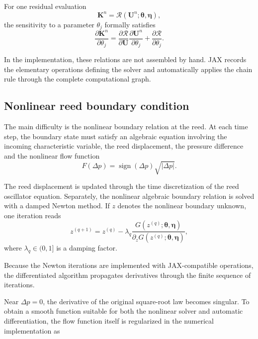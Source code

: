 \documentclass[11pt,a4paper]{report}
\theoremstyle{plain}
\theoremstyle{definition}
\begin{document}
For one residual evaluation
\begin{equation}
\mathbf{K}^n
=
\mathcal{R}
\left(
\mathbf{U}^n;
\boldsymbol{\theta},
\boldsymbol{\eta}
\right),
\end{equation}
the sensitivity to a parameter \(\theta_j\) formally satisfies
\begin{equation}
\frac{\partial \mathbf{K}^n}{\partial\theta_j}
=
\frac{\partial\mathcal{R}}{\partial\mathbf{U}}
\frac{\partial\mathbf{U}^n}{\partial\theta_j}
+
\frac{\partial\mathcal{R}}{\partial\theta_j}.
\label{eq:stage_sensitivity}
\end{equation}

In the implementation, these relations are not assembled by hand. JAX records
the elementary operations defining the solver and automatically applies the
chain rule through the complete computational graph.

\subsection{Nonlinear reed boundary condition}

The main difficulty is the nonlinear boundary relation at the reed. At each
time step, the boundary state must satisfy an algebraic equation involving the
incoming characteristic variable, the reed displacement, the pressure
difference and the nonlinear flow function
\begin{equation}
F(\Delta p)
=
\operatorname{sign}(\Delta p)
\sqrt{|\Delta p|}.
\end{equation}

The reed displacement is updated through the time discretization of the reed
oscillator equation. Separately, the nonlinear algebraic boundary relation is
solved with a damped Newton method. If \(z\) denotes the nonlinear boundary
unknown, one iteration reads
\begin{equation}
z^{(q+1)}
=
z^{(q)}
-
\lambda_q
\frac{
G(z^{(q)};\boldsymbol{\theta},\boldsymbol{\eta})
}{
\partial_z G(z^{(q)};\boldsymbol{\theta},\boldsymbol{\eta})
},
\label{eq:newton_iteration_diff}
\end{equation}
where \(\lambda_q\in(0,1]\) is a damping factor.

Because the Newton iterations are implemented with JAX-compatible operations,
the differentiated algorithm propagates derivatives through the finite sequence
of iterations.

Near $\Delta p=0$, the derivative of the original square-root law becomes
singular. To obtain a smooth function suitable for both the nonlinear solver
and automatic differentiation, the flow function itself is regularized in the
numerical implementation as
\end{document}
